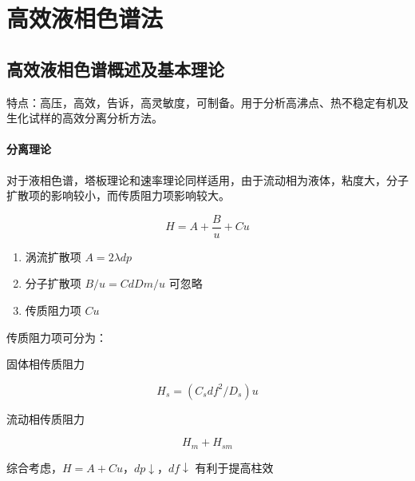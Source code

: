 \chapter{高效液相色谱法}

\section{高效液相色谱概述及基本理论}

特点：高压，高效，告诉，高灵敏度，可制备。用于分析高沸点、热不稳定有机及生化试样的高效分离分析方法。

\subsubsection{分离理论}

对于液相色谱，塔板理论和速率理论同样适用，由于流动相为液体，粘度大，分子扩散项的影响较小，而传质阻力项影响较大。

\begin{equation}
    H = A + \frac{B}{u} + Cu
\end{equation}

\begin{enumerate}
    \item 涡流扩散项 $A = 2 \lambda dp$
    \item 分子扩散项 $B / u = C d D m / u$ 可忽略
    \item 传质阻力项 $Cu$
\end{enumerate}

传质阻力项可分为：

固体相传质阻力

\begin{equation}
    H_s = (C_s df^2 / D_s)u
\end{equation}

流动相传质阻力

\begin{equation}
    H_m + H_{sm}
\end{equation}

综合考虑，$H = A + Cu$，$dp \downarrow$，$df \downarrow$ 有利于提高柱效


